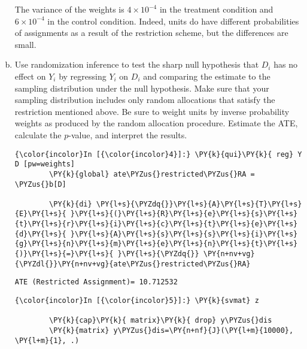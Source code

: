 \documentclass[11pt,notitlepage]{article}\usepackage[]{graphicx}\usepackage[]{color}
\makeatletter
\newenvironment{kframe}{%
 \def\at@end@of@kframe{}%
 \ifinner\ifhmode%
  \def\at@end@of@kframe{\end{minipage}}%
  \begin{minipage}{\columnwidth}%
 \fi\fi%
 \def\FrameCommand##1{\hskip\@totalleftmargin \hskip-\fboxsep
 \colorbox{shadecolor}{##1}\hskip-\fboxsep
     \hskip-\linewidth \hskip-\@totalleftmargin \hskip\columnwidth}%
 \MakeFramed {\advance\hsize-\width
   \@totalleftmargin\z@ \linewidth\hsize
   \@setminipage}}%
 {\par\unskip\endMakeFramed%
 \at@end@of@kframe}
\newenvironment{knitrout}{}{} %
\makeatother
\begin{document}
\begin{enumerate}[a)]
The variance of the weights is \ensuremath{4\times 10^{-4}} in the treatment condition and \ensuremath{6\times 10^{-4}} in the control condition. Indeed, units do have different probabilities of assignments as a result of the restriction scheme, but the differences are small.

\item Use randomization inference to test the sharp null hypothesis that $D_i$ has no effect on $Y_i$ by regressing $Y_i$ on $D_i$ and comparing the estimate to the sampling distribution under the null hypothesis. Make sure that your sampling distribution includes only random allocations that satisfy the restriction mentioned above. Be sure to weight units by inverse probability weights as produced by the random allocation procedure. Estimate the ATE, calculate the $p$-value, and interpret the results.

\begin{knitrout}
\color{fgcolor}\begin{kframe}
    \begin{Verbatim}[commandchars=\\\{\}]
{\color{incolor}In [{\color{incolor}4}]:} \PY{k}{qui}\PY{k}{ reg} Y D [pw=weights]
        \PY{k}{global} ate\PYZus{}restricted\PYZus{}RA = \PYZus{}b[D]
        
        \PY{k}{di} \PY{l+s}{\PYZdq{}}\PY{l+s}{A}\PY{l+s}{T}\PY{l+s}{E}\PY{l+s}{ }\PY{l+s}{(}\PY{l+s}{R}\PY{l+s}{e}\PY{l+s}{s}\PY{l+s}{t}\PY{l+s}{r}\PY{l+s}{i}\PY{l+s}{c}\PY{l+s}{t}\PY{l+s}{e}\PY{l+s}{d}\PY{l+s}{ }\PY{l+s}{A}\PY{l+s}{s}\PY{l+s}{s}\PY{l+s}{i}\PY{l+s}{g}\PY{l+s}{n}\PY{l+s}{m}\PY{l+s}{e}\PY{l+s}{n}\PY{l+s}{t}\PY{l+s}{)}\PY{l+s}{=}\PY{l+s}{ }\PY{l+s}{\PYZdq{}} \PY{n+nv+vg}{\PYZdl{}}\PY{n+nv+vg}{ate\PYZus{}restricted\PYZus{}RA}
\end{Verbatim}

    \begin{Verbatim}[commandchars=\\\{\}]
ATE (Restricted Assignment)= 10.712532
    \end{Verbatim}

    \begin{Verbatim}[commandchars=\\\{\}]
{\color{incolor}In [{\color{incolor}5}]:} \PY{k}{svmat} z
        
        \PY{k}{cap}\PY{k}{ matrix}\PY{k}{ drop} y\PYZus{}dis
        \PY{k}{matrix} y\PYZus{}dis=\PY{n+nf}{J}(\PY{l+m}{10000}, \PY{l+m}{1}, .)
        

\end{Verbatim}
\end{kframe}
\end{knitrout}
\end{enumerate}
\end{document}

